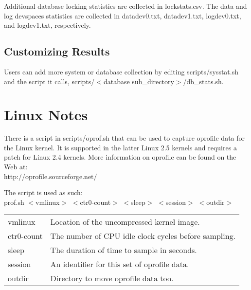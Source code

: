 \documentclass{article}
\begin{document}
\noindent
Additional database locking statistics are collected in lockstats.csv.  The
data and log devspaces statistics are collected in datadev0.txt, datadev1.txt,
logdev0.txt, and logdev1.txt, respectively.

\subsection{Customizing Results}

Users can add more system or database collection by editing scripts/sysstat.sh
and the script it calls,  scripts/$<$database sub\_directory$>$/db\_stats.sh.

\section{Linux Notes}

There is a script in scripts/oprof.sh that can be used to capture oprofile
data for the Linux kernel.  It is supported in the latter Linux 2.5 kernels
and requires a patch for Linux 2.4 kernels.  More information on oprofile can
be found on the Web at: \\
\indent http://oprofile.sourceforge.net/

\noindent
The script is used as such: \\
\indent prof.sh $<$vmlinux$>$ $<$ctr0-count$>$ $<$sleep$>$ $<$session$>$ $<$outdir$>$

\begin{tabular}[c]{ll}
vmlinux		& Location of the uncompressed kernel image. \\
ctr0-count	& The number of CPU idle clock cycles before sampling. \\
sleep		& The duration of time to sample in seconds. \\
session		& An identifier for this set of oprofile data. \\
outdir		& Directory to move oprofile data too. \\
\end{tabular}
\end{document}
